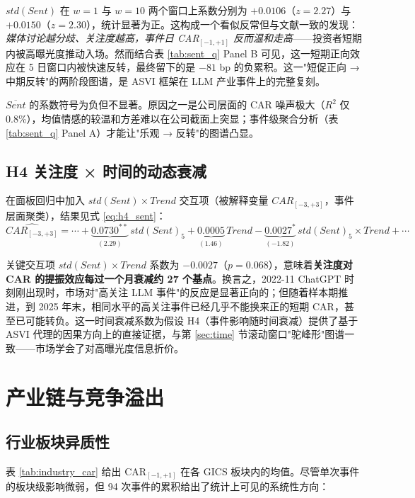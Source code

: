\documentclass[11pt]{ctexart}
\begin{document}
\textbf{$std(Sent)$} 在 $w=1$ 与 $w=10$ 两个窗口上系数分别为 $+0.0106$（$z=2.27$）与 $+0.0150$（$z=2.30$），统计显著为正。这构成一个看似反常但与文献一致的发现：\emph{媒体讨论越分歧、关注度越高，事件日 CAR$_{[-1,+1]}$ 反而温和走高}——投资者短期内被高曝光度推动入场。然而结合表 \ref{tab:sent_q} Panel B 可见，这一短期正向效应在 5 日窗口内被快速反转，最终留下的是 $-81$ bp 的负累积。这一"短促正向 → 中期反转"的两阶段图谱，是 \cite{DaEngelbergGao2011} ASVI 框架在 LLM 产业事件上的完整复刻。

\textbf{$\overline{Sent}$} 的系数符号为负但不显著。原因之一是公司层面的 CAR 噪声极大（$R^2$ 仅 0.8\%），均值情感的较温和方差难以在公司截面上突显；事件级聚合分析（表 \ref{tab:sent_q} Panel A）才能让"乐观 → 反转"的图谱凸显。

\subsection{H4 关注度 × 时间的动态衰减}

在面板回归中加入 $std(Sent)\times Trend$ 交互项（被解释变量 $CAR_{[-3,+3]}$，事件层面聚类），结果见式 \eqref{eq:h4_sent}：
\begin{equation}
\widehat{CAR_{[-3,+3]}} = \cdots + \underbrace{0.0730^{**}}_{(2.29)}\,std(Sent)_5 + \underbrace{0.0005}_{(1.46)}\,Trend - \underbrace{0.0027^{*}}_{(-1.82)}\,std(Sent)_5 \times Trend + \cdots
\label{eq:h4_sent}
\end{equation}

关键交互项 $std(Sent)\times Trend$ 系数为 $-0.0027$（$p=0.068$），意味着\textbf{关注度对 CAR 的提振效应每过一个月衰减约 27 个基点}。换言之，2022-11 ChatGPT 时刻刚出现时，市场对"高关注 LLM 事件"的反应是显著正向的；但随着样本期推进，到 2025 年末，相同水平的高关注事件已经几乎不能换来正的短期 CAR，甚至已可能转负。这一时间衰减系数为假设 H4（事件影响随时间衰减）提供了基于 ASVI 代理的因果方向上的直接证据，与第 \ref{sec:time} 节滚动窗口"驼峰形"图谱一致——市场学会了对高曝光度信息折价。

\section{产业链与竞争溢出}
\label{sec:spill}

\subsection{行业板块异质性}

表 \ref{tab:industry_car} 给出 CAR$_{[-1,+1]}$ 在各 GICS 板块内的均值。尽管单次事件的板块级影响微弱，但 94 次事件的累积给出了统计上可见的系统性方向：
\end{document}
